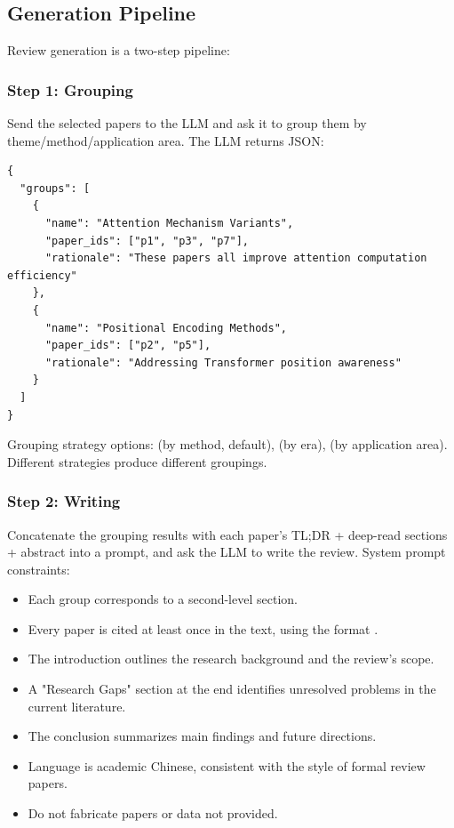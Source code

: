 \subsection{Generation Pipeline}

Review generation is a two-step pipeline:

\subsubsection{Step 1: Grouping}

Send the selected papers to the LLM and ask it to group them by theme/method/application area.
The LLM returns JSON:

\begin{verbatim}
{
  "groups": [
    {
      "name": "Attention Mechanism Variants",
      "paper_ids": ["p1", "p3", "p7"],
      "rationale": "These papers all improve attention computation efficiency"
    },
    {
      "name": "Positional Encoding Methods",
      "paper_ids": ["p2", "p5"],
      "rationale": "Addressing Transformer position awareness"
    }
  ]
}
\end{verbatim}

Grouping strategy options:  (by method, default),  (by era),
 (by application area). Different strategies produce different groupings.

\subsubsection{Step 2: Writing}

Concatenate the grouping results with each paper's TL;DR + deep-read sections + abstract into a
prompt, and ask the LLM to write the review. System prompt constraints:

\begin{itemize}
  \item Each group corresponds to a second-level section.
  \item Every paper is cited at least once in the text, using the format .
  \item The introduction outlines the research background and the review's scope.
  \item A "Research Gaps" section at the end identifies unresolved problems in the current
    literature.
  \item The conclusion summarizes main findings and future directions.
  \item Language is academic Chinese, consistent with the style of formal review papers.
  \item Do not fabricate papers or data not provided.
\end{itemize}

